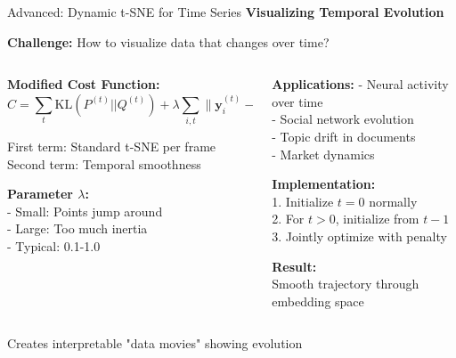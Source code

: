 \documentclass[10pt]{beamer}
\newcommand{\emphtext}[1]{\textcolor{upcblue}{\textbf{#1}}}
\newcommand{\conceptbox}[1]{\colorbox{upcblue!10}{\begin{minipage}{0.85\textwidth}\centering #1\end{minipage}}}
\begin{document}
\begin{frame}{Advanced: Dynamic t-SNE for Time Series}
\emphtext{Visualizing Temporal Evolution}

\vspace{0.3cm}
\textbf{Challenge:} How to visualize data that changes over time?

\vspace{0.3cm}
\begin{columns}[T]
\begin{column}{0.48\textwidth}
\textbf{Modified Cost Function:}
\footnotesize
$$C = \sum_t \text{KL}(P^{(t)}||Q^{(t)}) + \lambda \sum_{i,t} \|\mathbf{y}_i^{(t)} - \mathbf{y}_i^{(t-1)}\|^2$$

\vspace{0.2cm}
First term: Standard t-SNE per frame\\
Second term: Temporal smoothness

\vspace{0.2cm}
\textbf{Parameter $\lambda$:}\\
- Small: Points jump around\\
- Large: Too much inertia\\
- Typical: 0.1-1.0
\end{column}

\begin{column}{0.48\textwidth}
\textbf{Applications:}
\footnotesize
- Neural activity over time\\
- Social network evolution\\
- Topic drift in documents\\
- Market dynamics

\vspace{0.2cm}
\textbf{Implementation:}\\
1. Initialize $t=0$ normally\\
2. For $t>0$, initialize from $t-1$\\
3. Jointly optimize with penalty

\vspace{0.2cm}
\textbf{Result:}\\
Smooth trajectory through\\
embedding space
\end{column}
\end{columns}

\vspace{0.3cm}
\begin{center}
\conceptbox{\footnotesize Creates interpretable "data movies" showing evolution}
\end{center}
\end{frame}
\end{document}
